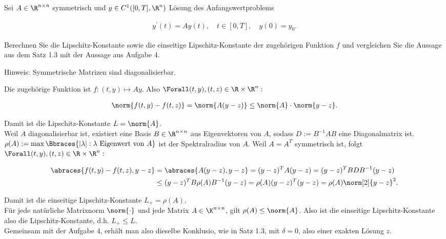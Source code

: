 \begin{exercise}

Sei $A \in \R^{n \times n}$ symmetrisch und $y \in C^1([0, T], \R^n)$ Lösung des Anfangswertproblems

\begin{align*}
  y^\prime(t) = A y(t),
  \quad
  t \in [0, T],
  \quad
  y(0) = y_0.
\end{align*}

Berechnen Sie die Lipschitz-Konstante sowie die einseitige Lipschitz-Konstante der zugehörigen Funktion $f$ und vergleichen Sie die Aussage aus dem Satz 1.3 mit der Aussage aus Aufgabe 4.

Hinweis: Symmetrische Matrizen sind diagonalisierbar.

\end{exercise}

\begin{solution}

Die zugehörige Funktion ist $f: (t, y) \mapsto Ay$.
Also $\Forall (t, y), (t, z) \in \R \times \R^n:$

\begin{align*}
  \norm{f(t, y) - f(t, z)}
  =
  \norm{A (y - z)}
  \leq
  \norm{A} \cdot \norm{y - z}.
\end{align*}

Damit ist die Lipschitz-Konstante $L = \norm{A}$. \\

Weil $A$ diagonalisierbar ist, existiert eine Basis $B \in \R^{n \times n}$ aus Eigenvektoren von $A$, sodass $D := B^{-1} A B$ eine Diagonalmatrix ist.
$\rho(A) := \max \Bbraces{|\lambda|: \lambda \text{ Eigenwert von } A}$ ist der Spektralradius von $A$.
Weil $A = A^T$ symmetrisch ist, folgt $\Forall (t, y), (t, z) \in \R \times \R^n:$

\begin{align*}
  \abraces{f(t, y) - f(t, z), y - z}
  & =
  \abraces{A (y - z), y - z}
  =
  (y - z)^T A (y - z)
  =
  (y - z)^T B D B^{-1} (y - z) \\
  & \leq
  (y - z)^T B \rho(A) B^{-1} (y - z)
  =
  \rho(A) (y - z)^T (y - z)
  =
  \rho(A) \norm[2]{y - z}^2.
\end{align*}

Damit ist die einseitige Lipschitz-Konstante $L_+ = \rho(A)$. \\

Für jede natürliche Matrixnorm $\norm{\cdot}$ und jede Matrix $A \in \K^{n \times n}$, gilt $\rho(A) \leq \norm{A}$. Also ist die einseitige Lipschitz-Konstante  also die Lipschitz-Konstante, d.h. $L_+ \leq L$. \\

Gemeinsam mit der Aufgabe 4, erhält man also dieselbe Konklusio, wie in Satz 1.3, mit $\delta = 0$, also einer exakten Lösung $z$.

\end{solution}
